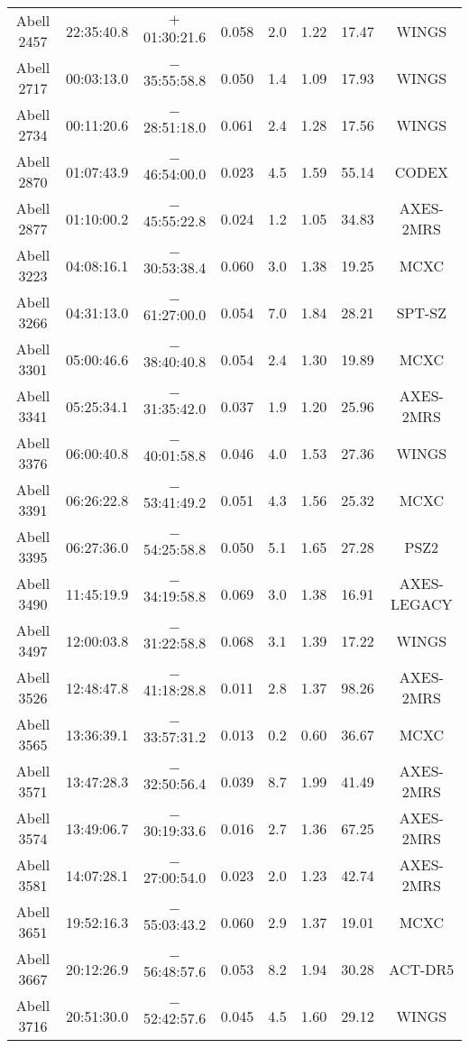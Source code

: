 \begin{table}
\begin{tabular}{cccccccc}
Abell 2457 & 22:35:40.8 & $+$01:30:21.6 & 0.058 & 2.0 & 1.22 & 17.47 & WINGS \\
Abell 2717 & 00:03:13.0 & $-$35:55:58.8 & 0.050 & 1.4 & 1.09 & 17.93 & WINGS \\
Abell 2734 & 00:11:20.6 & $-$28:51:18.0 & 0.061 & 2.4 & 1.28 & 17.56 & WINGS \\
Abell 2870 & 01:07:43.9 & $-$46:54:00.0 & 0.023 & 4.5 & 1.59 & 55.14 & CODEX \\
Abell 2877 & 01:10:00.2 & $-$45:55:22.8 & 0.024 & 1.2 & 1.05 & 34.83 & AXES-2MRS \\
Abell 3223 & 04:08:16.1 & $-$30:53:38.4 & 0.060 & 3.0 & 1.38 & 19.25 & MCXC \\
Abell 3266 & 04:31:13.0 & $-$61:27:00.0 & 0.054 & 7.0 & 1.84 & 28.21 & SPT-SZ \\
Abell 3301 & 05:00:46.6 & $-$38:40:40.8 & 0.054 & 2.4 & 1.30 & 19.89 & MCXC \\
Abell 3341 & 05:25:34.1 & $-$31:35:42.0 & 0.037 & 1.9 & 1.20 & 25.96 & AXES-2MRS \\
Abell 3376 & 06:00:40.8 & $-$40:01:58.8 & 0.046 & 4.0 & 1.53 & 27.36 & WINGS \\
Abell 3391 & 06:26:22.8 & $-$53:41:49.2 & 0.051 & 4.3 & 1.56 & 25.32 & MCXC \\
Abell 3395 & 06:27:36.0 & $-$54:25:58.8 & 0.050 & 5.1 & 1.65 & 27.28 & PSZ2 \\
Abell 3490 & 11:45:19.9 & $-$34:19:58.8 & 0.069 & 3.0 & 1.38 & 16.91 & AXES-LEGACY \\
Abell 3497 & 12:00:03.8 & $-$31:22:58.8 & 0.068 & 3.1 & 1.39 & 17.22 & WINGS \\
Abell 3526 & 12:48:47.8 & $-$41:18:28.8 & 0.011 & 2.8 & 1.37 & 98.26 & AXES-2MRS \\
Abell 3565 & 13:36:39.1 & $-$33:57:31.2 & 0.013 & 0.2 & 0.60 & 36.67 & MCXC \\
Abell 3571 & 13:47:28.3 & $-$32:50:56.4 & 0.039 & 8.7 & 1.99 & 41.49 & AXES-2MRS \\
Abell 3574 & 13:49:06.7 & $-$30:19:33.6 & 0.016 & 2.7 & 1.36 & 67.25 & AXES-2MRS \\
Abell 3581 & 14:07:28.1 & $-$27:00:54.0 & 0.023 & 2.0 & 1.23 & 42.74 & AXES-2MRS \\
Abell 3651 & 19:52:16.3 & $-$55:03:43.2 & 0.060 & 2.9 & 1.37 & 19.01 & MCXC \\
Abell 3667 & 20:12:26.9 & $-$56:48:57.6 & 0.053 & 8.2 & 1.94 & 30.28 & ACT-DR5 \\
Abell 3716 & 20:51:30.0 & $-$52:42:57.6 & 0.045 & 4.5 & 1.60 & 29.12 & WINGS \\

\end{tabular}
\end{table}
